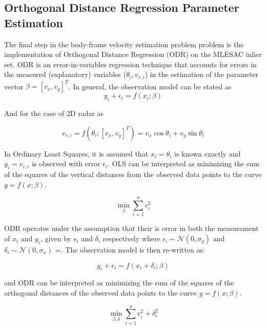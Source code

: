 \documentclass[]{article}
\begin{document}
\subsection{Orthogonal Distance Regression Parameter Estimation}

The final step in the body-frame velocity estimation problem problem is the implementation of Orthogonal Distance Regression (ODR) \cite{ODR_1987} \cite{ODRPACK95} on the MLESAC inlier set. ODR is an error-in-variables regression technique that accounts for errors in the measured (explanatory) variables ($\theta_i, v_{r,i}$) in the estimation of the parameter vector $\beta=[v_x,v_y]^T$. In general, the observation model can be stated as
\begin{equation}
	y_i + \epsilon_i = f(x_i;\beta)
\end{equation}

And for the case of 2D radar as
 
\begin{equation}
	v_{r,i} = f(\theta_i; [v_x, v_y]^T) = v_x \cos \theta_i + v_y \sin \theta_i 
\end{equation}

In Ordinary Least Squares, it is assumed that $x_i = \theta_i$ is known exactly and $y_i = v_{r,i}$ is observed with error $\epsilon_i$. OLS can be interpreted as minimizing the sum of the squares of the vertical distances from the observed data points to the curve $y = f(x;\beta)$.

\begin{equation}
	 \min_{\beta} \sum_{i=1}^n \epsilon_i^2 
\end{equation}

ODR operates under the assumption that their is error in both the measurement of $x_i$ and $y_i$, given by $\epsilon_i$ and $\delta_i$ respectively where $\epsilon_i \sim \mathcal{N}(0,\sigma_y)$ and $\delta_i \sim \mathcal{N}(0,\sigma_x)$ =. The observation model is then re-written as:

\begin{equation}
	 y_i + \epsilon_i = f(x_i + \delta_i;\beta) 
\end{equation}

and ODR can be interpreted as minimizing the sum of the squares of the orthogonal distances of the observed data points to the curve $y = f(x;\beta)$.

\begin{equation}
	 \min_{\beta, \delta} \sum_{i=1}^n \epsilon_i^2 + \delta_i^2 
\end{equation}


\end{document}
